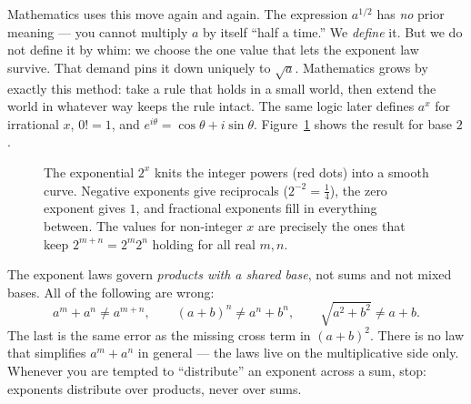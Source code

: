 \begin{whybox}
Mathematics uses this move again and again.
The expression $a^{1/2}$ has \emph{no} prior meaning --- you cannot multiply $a$
by itself ``half a time.'' We \emph{define} it. But we do not define it by whim:
we choose the one value that lets the exponent law survive. That demand pins it
down uniquely to $\sqrt a$. Mathematics grows by exactly this method: take a rule
that holds in a small world, then extend the world in whatever way keeps the rule
intact. The same logic later defines $a^x$ for irrational $x$, $0! = 1$, and
$e^{i\theta} = \cos\theta + i\sin\theta$. Figure~\ref{ch40:fig-exp} shows the
result for base $2$.
\end{whybox}

\begin{figure}[htbp]
\centering
{}
\caption{The exponential $2^x$ knits the integer powers (red dots) into a smooth
curve. Negative exponents give reciprocals ($2^{-2}=\tfrac14$), the zero exponent
gives $1$, and fractional exponents fill in everything between. The values for
non-integer $x$ are precisely the ones that keep $2^{m+n}=2^m2^n$ holding for all
real $m,n$.}
\label{ch40:fig-exp}
\end{figure}

\begin{trapbox}
The exponent laws govern \emph{products with a shared base}, not sums and not
mixed bases. All of the following are wrong:
\[
  a^m + a^n \neq a^{m+n}, \qquad
  (a+b)^n \neq a^n + b^n, \qquad
  \sqrt{a^2+b^2} \neq a + b.
\]
The last is the same error as the missing cross term in $(a+b)^2$. There is no law
that simplifies $a^m + a^n$ in general --- the laws live on the multiplicative side
only. Whenever you are tempted to ``distribute'' an exponent across a sum, stop:
exponents distribute over products, never over sums.
\end{trapbox}

